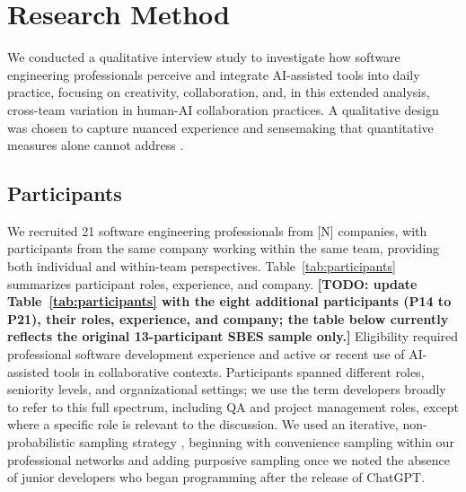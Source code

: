 \documentclass[10pt,journal,compsoc]{IEEEtran}
\begin{document}
\section{Research Method}

We conducted a qualitative interview study \cite{seaman2008} to investigate how software engineering professionals perceive and integrate AI-assisted tools into daily practice, focusing on creativity, collaboration, and, in this extended analysis, cross-team variation in human-AI collaboration practices. A qualitative design was chosen to capture nuanced experience and sensemaking that quantitative measures alone cannot address \cite{seaman2008}.

\subsection{Participants}

We recruited 21 software engineering professionals from [N] companies, with participants from the same company working within the same team, providing both individual and within-team perspectives. Table~\ref{tab:participants} summarizes participant roles, experience, and company. \textbf{[TODO: update Table~\ref{tab:participants} with the eight additional participants (P14 to P21), their roles, experience, and company; the table below currently reflects the original 13-participant SBES sample only.]} Eligibility required professional software development experience and active or recent use of AI-assisted tools in collaborative contexts. Participants spanned different roles, seniority levels, and organizational settings; we use the term developers broadly to refer to this full spectrum, including QA and project management roles, except where a specific role is relevant to the discussion. We used an iterative, non-probabilistic sampling strategy \cite{baltes2022}, beginning with convenience sampling within our professional networks and adding purposive sampling once we noted the absence of junior developers who began programming after the release of ChatGPT.
\end{document}
